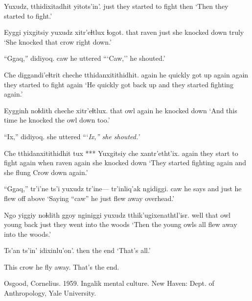 \documentclass[12pt]{article}
\begin{document}
\gll Yuxudz, tthidixitadhit        yitots'in'.
just   {they started to fight} then
\glt `Then they started to fight.' 
\glend

\gll Eyggi yixgitsiy yuxudz {xitr'eɬtlux}     ɬogot.
that  raven     just   {she knocked down} truly 
\glt `She knocked that crow right down.' 
\glend

\gll ``Ggaq,'' didiyoq.
caw  {he uttered }
\glt ```Caw,'' he shouted.' 
\glend

\gll Che   diggandi'eɬtrit   cheche tthidanxitithidhit. 
again {he quickly got up again} again  {they started to fight again}
\glt `He quickly got back up and they started fighting again.' 
\glend

\gll Eygginh noɬdith cheche xitr'eɬtlux.
that    owl     again  {he knocked down}
\glt `And this time he knocked the owl down too.' 
\glend

\gll ``Ix,'' didiyoq. 
{} {she uttered}
\glt ```\em Ix,'' \em she shouted.'
\glend

\gll Che   tthidanxitithidhit    tux  ***   Yuxgitsiy che   xantr'etht'ix.
again {they start to fight again} when  raven     again {she knocked down}
\glt `They started fighting again and she flung Crow down again.' 
\glend

\gll ``Ggaq,'' tr'i'ne ts'i yuxudz tr'ine--- tr'inliq'ak ngidiggi.
caw  {he says} and  just      {}    {he flew off}  above 
\glt `Saying ``caw'' he just flew away overhead.' 
\glend

\gll Ngo  yiggiy noɬdith ggoy  nginiggi yuxudz tthik'ugixenathtl'isr. 
well that   owl     young back     just   {they went into the woods}
\glt `Then the young owls all flew away into the woods.' 
\glend

\gll Ts'an ts'in' idixinlu'on'. 
then {}     {the end}
\glt `That's all.' 
\glend

This crow he fly away. That's the end.

\bigskip
Osgood, Cornelius. 1959. Ingalik mental culture. New Haven: Dept. of
Anthropology, Yale University. 
\end{document}
